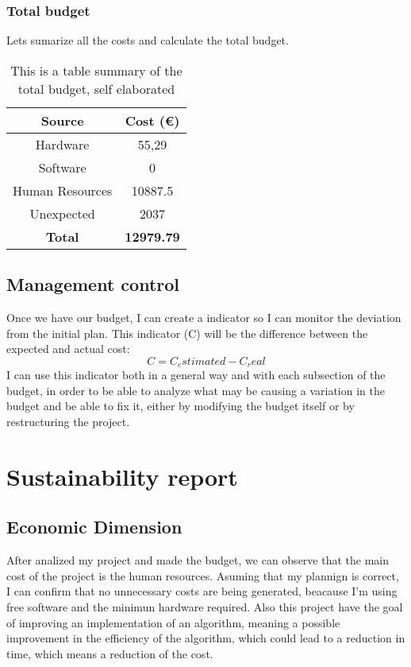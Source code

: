 \subsubsection*{Total budget}
Lets sumarize all the costs and calculate the total budget.
\begin{table}[H]
    \begin{adjustwidth}{-1in}{-1in} %
    \centering
    \begin{tabular}{|c|c|}
    \hline
    \textbf{Source} & \textbf{Cost (€)} \\ 
    \hline
    Hardware &  55,29 \\
    \hline
    Software & 0 \\
    \hline
    Human Resources & 10887.5 \\
    \hline
    Unexpected & 2037 \\
    \hline
    \hline
    \textbf{Total} & \textbf{12979.79}  \\
    \hline
    \end{tabular}
    \caption[{[B\&S] Final budget}]{This is a table summary of the total budget, self elaborated}
    \label{total_budget}
    \end{adjustwidth}
    \end{table}
\subsection{Management control}
Once we have our budget, I can create a indicator so I can monitor the deviation from the initial plan.
This indicator (C) will be the difference between the expected and actual cost:
$$
C = C_estimated - C_real
$$ 
I can use this indicator both in a general way and with each subsection of the budget, in order to be able to analyze what may be causing a variation in the budget and be able to fix it, either by modifying the budget itself or by restructuring the project.
\section{Sustainability report}
\subsection{Economic Dimension}
After analized my project and made the budget, we can observe that the main cost of the project is the human resources.
Asuming that my plannign is correct, I can confirm that no unnecessary costs are being generated, beacause I'm using free software and the minimun hardware required.
Also this project have the goal of improving an implementation of an algorithm, meaning a possible improvement in the efficiency of the algorithm, which could lead to a reduction in time, which means a reduction of the cost.
